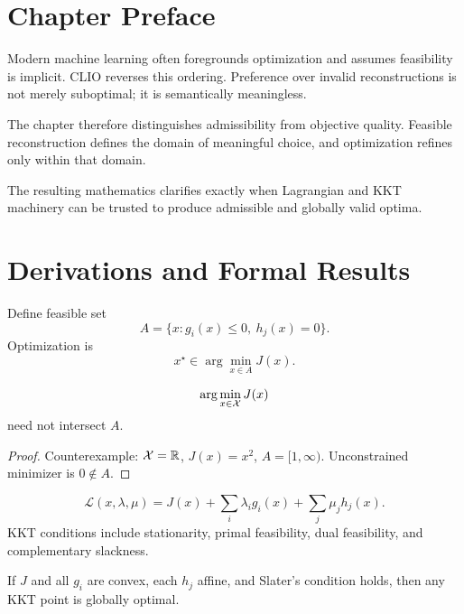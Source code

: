 \section{Chapter Preface}
Modern machine learning often foregrounds optimization and assumes feasibility is implicit. CLIO reverses this ordering. Preference over invalid reconstructions is not merely suboptimal; it is semantically meaningless.

The chapter therefore distinguishes admissibility from objective quality. Feasible reconstruction defines the domain of meaningful choice, and optimization refines only within that domain.

The resulting mathematics clarifies exactly when Lagrangian and KKT machinery can be trusted to produce admissible and globally valid optima.

\section{Derivations and Formal Results}
Define feasible set
\[
A=\{x:g_i(x)\le0,\ h_j(x)=0\}.
\]
Optimization is
\[
x^\star\in\arg\min_{x\in A}J(x).
\]

\begin{proposition}
\[
\arg\min_{x\in\mathcal{X}}J(x)
\]
need not intersect \(A\).
\end{proposition}

\begin{proof}
Counterexample: \(\mathcal{X}=\mathbb R\), \(J(x)=x^2\), \(A=[1,\infty)\). Unconstrained minimizer is \(0\notin A\).
\end{proof}

\begin{definition}
\[
\mathcal L(x,\lambda,\mu)=J(x)+\sum_i\lambda_i g_i(x)+\sum_j\mu_j h_j(x).
\]
KKT conditions include stationarity, primal feasibility, dual feasibility, and complementary slackness.
\end{definition}

\begin{theorem}
If \(J\) and all \(g_i\) are convex, each \(h_j\) affine, and Slater's condition holds, then any KKT point is globally optimal.
\end{theorem}
